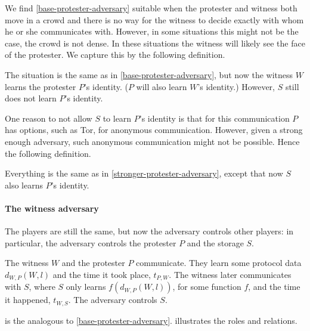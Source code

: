 We find \cref{base-protester-adversary} suitable when the protester and witness 
both move in a crowd and there is no way for the witness to decide exactly with 
whom he or she communicates with.
However, in some situations this might not be the case, \eg the crowd is not 
dense.
In these situations the witness will likely see the face of the protester.
We capture this by the following definition.

\begin{definition}%
  \label{stronger-protester-adversary}
  The situation is the same as in \cref{base-protester-adversary}, but now the 
  witness \(W\) learns the protester \(P\)'s identity.
  (\(P\) will also learn \(W\)'s identity.)
  However, \(S\) still does not learn \(P\)'s identity.
\end{definition}

One reason to not allow \(S\) to learn \(P\)'s identity is that for this 
communication \(P\) has options, such as \ac{Tor}, for anonymous communication.
However, given a strong enough adversary, such anonymous communication might 
not be possible.
Hence the following definition.

\begin{definition}%
  \label{strongest-protester-adversary}
  Everything is the same as in \cref{stronger-protester-adversary}, except that 
  now \(S\) also learns \(P\)'s identity.
\end{definition}

\paragraph{The witness adversary}

The players are still the same, but now the adversary controls other players: 
in particular, the adversary controls the protester \(P\) and the storage 
\(S\).

\begin{definition}\label{base-witness-adversary}
  The witness \(W\) and the protester \(P\) communicate.
  They learn some protocol data \(d_{W,P}(W, l)\) and the time it took place, 
  \(t_{P,W}\).
  The witness later communicates with \(S\), where \(S\) only learns 
  \(f(d_{W,P}(W, l))\), for some function \(f\), and the time it happened, 
  \(t_{W,S}\).
  The adversary controls \(S\).
\end{definition}

 is the analogous to 
\cref{base-protester-adversary}.
 illustrates the roles and relations.


